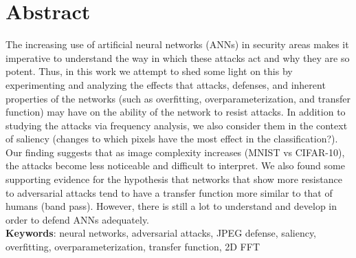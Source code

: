 \section*{Abstract}


The increasing use of artificial neural networks (ANNs) in security areas makes it imperative to understand the way in which these attacks act and why they are so potent. Thus, in this work we attempt to shed some light on this by experimenting and analyzing the effects that attacks, defenses, and inherent properties of the networks (such as overfitting, overparameterization, and transfer function) may have on the ability of the network to resist attacks. In addition to studying the attacks via frequency analysis, we also consider them in the context of saliency (changes to which pixels have the most effect in the classification?). Our finding suggests that as image complexity increases (MNIST vs CIFAR-10), the attacks become less noticeable and difficult to interpret.  We also found some supporting evidence for the hypothesis that networks that show more resistance to adversarial attacks tend to have a transfer function more similar to that of humans (band pass). However, there is still a lot to understand and develop in order to defend ANNs adequately. \\[1cm]

\noindent\textbf{Keywords}: neural networks, adversarial attacks, JPEG defense, saliency, overfitting, overparameterization, transfer function, 2D FFT